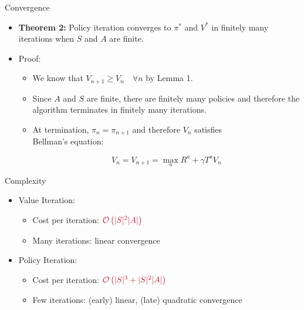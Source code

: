 \documentclass[11pt,table]{beamer}
\begin{document}
\begin{frame}{Convergence}

\begin{itemize}
    \item \textbf{Theorem 2:} Policy iteration \textcolor{red1}{converges to $\pi^{*}$ and $V^{*}$} in finitely many iterations when $S$ and $A$ are finite.
\vspace{3mm}
\pause

\item Proof:

\begin{itemize}
     

\item We know that $V_{n+1} \geq V_{n} \quad \forall n$ by Lemma 1.\\[2ex]
\item Since $A$ and $S$ are finite, there are finitely many policies and therefore the algorithm terminates in finitely many iterations.\\[2ex]
\item At termination, $\pi_{n}=\pi_{n+1}$ and therefore $V_{n}$ satisfies\\[2ex] Bellman's equation:

$$
V_{n}=V_{n+1}=\max _{a} R^{a}+\gamma T^{a} V_{n}
$$ 
\end{itemize}
    \end{itemize}
\end{frame}

\begin{frame}{Complexity}

    \begin{itemize}
        \item Value Iteration:

        \begin{itemize}
             
        
\item Cost per iteration: $\textcolor{red1}{\mathcal{O}\left(|S|^{2}|A|\right)}$
\item Many iterations: \textcolor{red1}{linear convergence}
\end{itemize}
\vspace{3mm}
\item Policy Iteration:

\begin{itemize}
     

\item Cost per iteration: $\textcolor{red1}{\mathcal{O}\left(|S|^{3}+|S|^{2}|A|\right)}$
\item Few iterations: \textcolor{red1}{(early) linear, (late) quadratic convergence}
    \end{itemize}
    \end{itemize}
\end{frame}
\end{document}
